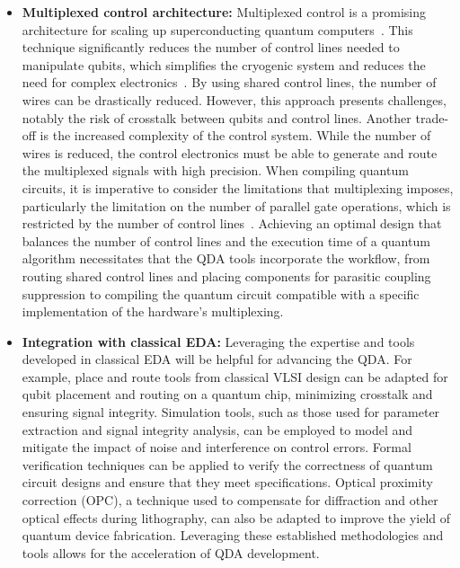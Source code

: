\documentclass[a4paper,onecolumn,11pt,unpublished]{quantumarticle}
\begin{document}
\begin{itemize}
    \item \textbf{Multiplexed control architecture: }Multiplexed control is a promising architecture for scaling up superconducting quantum computers~\cite{Shi2023multiplexedControl, zhao2024MultiplexedControl}. This technique significantly reduces the number of control lines needed to manipulate qubits, which simplifies the cryogenic system and reduces the need for complex electronics~\cite{Acharya2023cryo-CMOSmultiplexer}. 
    By using shared control lines, the number of wires can be drastically reduced. 
    However, this approach presents challenges, notably the risk of crosstalk between qubits and control lines. 
    Another trade-off is the increased complexity of the control system. While the number of wires is reduced, the control electronics must be able to generate and route the multiplexed signals with high precision. 
    When compiling quantum circuits, it is imperative to consider the limitations that multiplexing imposes, particularly the limitation on the number of parallel gate operations, which is restricted by the number of control lines~\cite{Richter2025multiplexedControl}.
    Achieving an optimal design that balances the number of control lines and the execution time of a quantum algorithm necessitates that the QDA tools incorporate the workflow, from routing shared control lines and placing components for parasitic coupling suppression to compiling the quantum circuit compatible with a specific implementation of the hardware's multiplexing.
    
    \item \textbf{Integration with classical EDA: }Leveraging the expertise and tools developed in classical EDA will be helpful for advancing the QDA. For example, place and route tools from classical VLSI design can be adapted for qubit placement and routing on a quantum chip, minimizing crosstalk and ensuring signal integrity. Simulation tools, such as those used for parameter extraction and signal integrity analysis, can be employed to model and mitigate the impact of noise and interference on control errors. Formal verification techniques can be applied to verify the correctness of quantum circuit designs and ensure that they meet specifications. Optical proximity correction (OPC), a technique used to compensate for diffraction and other optical effects during lithography, can also be adapted to improve the yield of quantum device fabrication. Leveraging these established methodologies and tools allows for the acceleration of QDA development.
        

\end{itemize}
\end{document}
